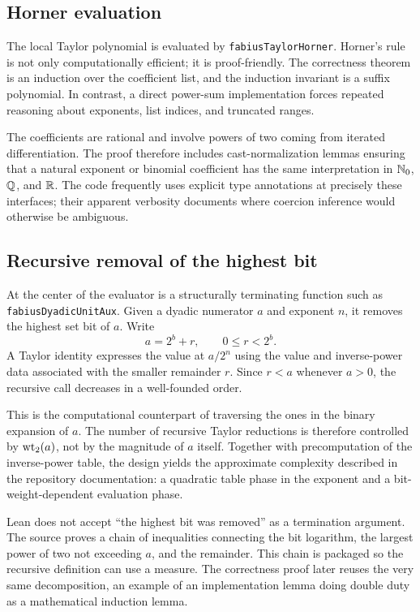 \documentclass[11pt,oneside]{article}
\theoremstyle{definition}
\theoremstyle{remark}
\begin{document}
\subsection{Horner evaluation}
The local Taylor polynomial is evaluated by \nolinkurl{fabiusTaylorHorner}.  Horner's rule is not only computationally efficient; it is proof-friendly.  The correctness theorem is an induction over the coefficient list, and the induction invariant is a suffix polynomial.  In contrast, a direct power-sum implementation forces repeated reasoning about exponents, list indices, and truncated ranges.

The coefficients are rational and involve powers of two coming from iterated differentiation.  The proof therefore includes cast-normalization lemmas ensuring that a natural exponent or binomial coefficient has the same interpretation in \(\mathbb{N}_{0}\), \(\mathbb{Q}\), and \(\mathbb{R}\).  The code frequently uses explicit type annotations at precisely these interfaces; their apparent verbosity documents where coercion inference would otherwise be ambiguous.

\subsection{Recursive removal of the highest bit}
At the center of the evaluator is a structurally terminating function such as \nolinkurl{fabiusDyadicUnitAux}.  Given a dyadic numerator \(a\) and exponent \(n\), it removes the highest set bit of \(a\).  Write
\[
  a=2^b+r,
  \qquad 0\leq r<2^b.
\]
A Taylor identity expresses the value at \(a/2^n\) using the value and inverse-power data associated with the smaller remainder \(r\).  Since \(r<a\) whenever \(a>0\), the recursive call decreases in a well-founded order.

This is the computational counterpart of traversing the ones in the binary expansion of \(a\).  The number of recursive Taylor reductions is therefore controlled by \(\operatorname{wt}_{2}(a)\), not by the magnitude of \(a\) itself.  Together with precomputation of the inverse-power table, the design yields the approximate complexity described in the repository documentation: a quadratic table phase in the exponent and a bit-weight-dependent evaluation phase.

Lean does not accept ``the highest bit was removed'' as a termination argument.  The source proves a chain of inequalities connecting the bit logarithm, the largest power of two not exceeding \(a\), and the remainder.  This chain is packaged so the recursive definition can use a measure.  The correctness proof later reuses the very same decomposition, an example of an implementation lemma doing double duty as a mathematical induction lemma.
\end{document}
